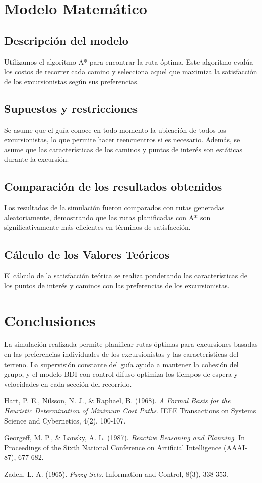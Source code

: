 \documentclass[10pt,twocolumn]{article}
\begin{document}
	\section{Modelo Matemático}
	
	\subsection{Descripción del modelo}
	Utilizamos el algoritmo A* para encontrar la ruta óptima. Este algoritmo evalúa los costos de recorrer cada camino y selecciona aquel que maximiza la satisfacción de los excursionistas según sus preferencias.
	
	\subsection{Supuestos y restricciones}
	Se asume que el guía conoce en todo momento la ubicación de todos los excursionistas, lo que permite hacer reencuentros si es necesario. Además, se asume que las características de los caminos y puntos de interés son estáticas durante la excursión.
	
	\subsection{Comparación de los resultados obtenidos}
	Los resultados de la simulación fueron comparados con rutas generadas aleatoriamente, demostrando que las rutas planificadas con A* son significativamente más eficientes en términos de satisfacción.
	
	\subsection{Cálculo de los Valores Teóricos}
	El cálculo de la satisfacción teórica se realiza ponderando las características de los puntos de interés y caminos con las preferencias de los excursionistas.
	
	\section{Conclusiones}
	La simulación realizada permite planificar rutas óptimas para excursiones basadas en las preferencias individuales de los excursionistas y las características del terreno. La supervisión constante del guía ayuda a mantener la cohesión del grupo, y el modelo BDI con control difuso optimiza los tiempos de espera y velocidades en cada sección del recorrido.
	
	\begin{thebibliography}{9}
		Hart, P. E., Nilsson, N. J., \& Raphael, B. (1968). \textit{A Formal Basis for the Heuristic Determination of Minimum Cost Paths}. IEEE Transactions on Systems Science and Cybernetics, 4(2), 100-107.
		
		Georgeff, M. P., \& Lansky, A. L. (1987). \textit{Reactive Reasoning and Planning}. In Proceedings of the Sixth National Conference on Artificial Intelligence (AAAI-87), 677-682.
		
		Zadeh, L. A. (1965). \textit{Fuzzy Sets}. Information and Control, 8(3), 338-353.
	\end{thebibliography}
	
\end{document}
